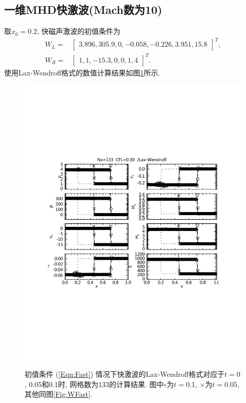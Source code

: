 \documentclass[10.5pt
]{article}
\begin{document}
\subsection{一维MHD快激波(Mach数为10)\citep{Dai1994}}
取$x_0 = 0.2$, 快磁声激波的初值条件为
\begin{align}
W_L =& \left[\begin{array}{cccccc}
3.896,
305.9,
0,
-0.058,
-0.226,
3.951,
15.8
\end{array}\right]^T,
\nonumber\\
W_R =& \left[\begin{array}{ccccccc}
1,
1,
-15.3,
0,
0,
1,
4
\end{array}\right]^T.\label{Eqn:Fast}
\end{align}
使用Lax-Wendroff格式的数值计算结果如图\ref{Fig:Fast}所示.
\begin{figure}[htb]
\begin{center}
\includegraphics[height=.78\textwidth]{hw4_lw_2f.pdf}
\caption{初值条件 (\ref{Eqn:Fast}) 情况下快激波的Lax-Wendroff格式对应于$t=0$, 0.05和0.1时, 网格数为133的计算结果. 图中$\circ$为$t=$0.1, $\times$为$t=$0.05, 其他同图\ref{Fig:WFast}. }\label{Fig:Fast}
\end{center}
\end{figure}
\end{document}
